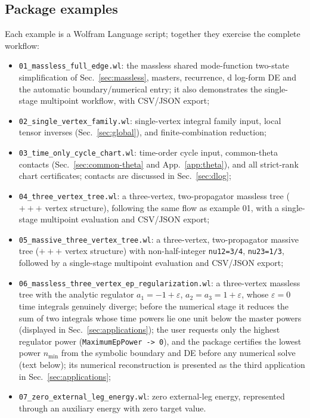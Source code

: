 \documentclass[11pt,a4paper]{article}
\numberwithin{table}{section}
\begin{document}
\subsection{Package examples}
\label{sec:examples}
Each example is a Wolfram Language script; together they exercise the complete workflow:
\begin{itemize}
  \item \texttt{01\_massless\_full\_edge.wl}: the massless shared mode-function two-state simplification of
        Sec.~\ref{sec:massless}, masters, recurrence, d log-form DE and the automatic
        boundary/numerical entry; it also demonstrates the
        single-stage multipoint workflow, with CSV/JSON export;
  \item \texttt{02\_single\_vertex\_family.wl}: single-vertex integral family input, local tensor
        inverses (Sec.~\ref{sec:global}), and finite-combination reduction;
  \item \texttt{03\_time\_only\_cycle\_chart.wl}: time-order cycle input, common-theta contacts
        (Sec.~\ref{sec:common-theta} and App.~\ref{app:theta}), and
        all strict-rank chart certificates; contacts are discussed in Sec.~\ref{sec:dlog};
  \item \texttt{04\_three\_vertex\_tree.wl}: a three-vertex, two-propagator massless tree
        ($+++$ vertex structure), following the same flow as example 01, with a single-stage
        multipoint evaluation and CSV/JSON export;
  \item \texttt{05\_massive\_three\_vertex\_tree.wl}: a three-vertex, two-propagator massive tree
        ($+++$ vertex structure) with non-half-integer \texttt{nu12=3/4}, \texttt{nu23=1/3},
        followed by a single-stage multipoint evaluation and CSV/JSON export;
  \item \texttt{06\_massless\_three\_vertex\_ep\_regularization.wl}: a three-vertex massless tree
        with the analytic regulator $a_1=-1+\varepsilon$, $a_2=a_3=1+\varepsilon$, whose
        $\varepsilon=0$ time integrals genuinely diverge; before the numerical stage it reduces
        the sum of two integrals whose time powers lie one unit below the master powers
        (displayed in Sec.~\ref{sec:applications}); the user requests
        only the highest regulator power (\texttt{MaximumEpPower -> 0}), and the package
        certifies the lowest power $n_{\min}$ from the symbolic boundary and DE before any
        numerical solve (text below); its numerical
        reconstruction is presented as the third application in Sec.~\ref{sec:applications};
  \item \texttt{07\_zero\_external\_leg\_energy.wl}: zero external-leg energy, represented through an auxiliary energy with zero target value.
\end{itemize}
\end{document}
